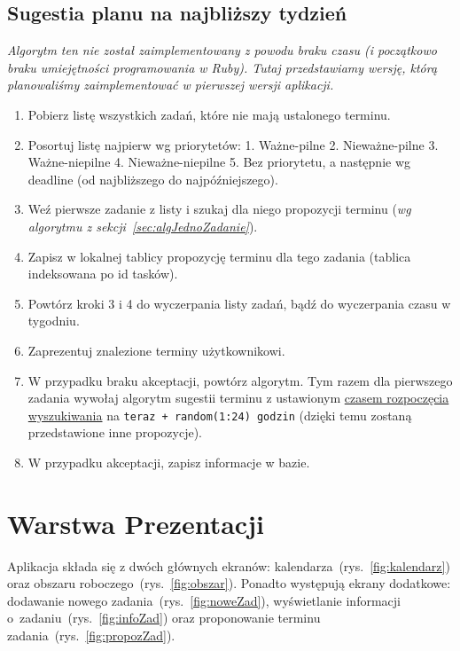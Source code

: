 \documentclass[pdflatex,11pt]{aghdpl}
\begin{document}
\subsection{Sugestia planu na najbliższy tydzień}
\label{sec:algPlanTygodniowy}

\textit{Algorytm ten nie został zaimplementowany z powodu braku czasu (i początkowo braku umiejętności programowania w Ruby). Tutaj przedstawiamy wersję, którą planowaliśmy zaimplementować w pierwszej wersji aplikacji.}

\begin{enumerate}
\item Pobierz listę wszystkich zadań, które nie mają ustalonego terminu.
\item Posortuj listę najpierw wg priorytetów: 1. Ważne-pilne 2. Nieważne-pilne 3. Ważne-niepilne 4. Nieważne-niepilne 5. Bez priorytetu, a następnie wg deadline (od najbliższego do najpóźniejszego).
\item Weź pierwsze zadanie z listy i szukaj dla niego propozycji terminu (\textit{wg algorytmu z sekcji~\ref{sec:algJednoZadanie}}).
\item Zapisz w lokalnej tablicy propozycję terminu dla tego zadania (tablica indeksowana po id tasków).
\item Powtórz kroki 3 i 4 do wyczerpania listy zadań, bądź do wyczerpania czasu w tygodniu.
\item Zaprezentuj znalezione terminy użytkownikowi.
\item W przypadku braku akceptacji, powtórz algorytm. Tym razem dla pierwszego zadania wywołaj algorytm sugestii terminu z ustawionym \underline{czasem rozpoczęcia wyszukiwania} na \texttt{teraz + random(1:24) godzin} (dzięki temu zostaną przedstawione inne propozycje).
\item W przypadku akceptacji, zapisz informacje w bazie.
\end{enumerate}


\section{Warstwa Prezentacji}

Aplikacja składa się z dwóch głównych ekranów: kalendarza~(rys.~\ref{fig:kalendarz}) oraz obszaru roboczego~(rys.~\ref{fig:obszar}). Ponadto występują ekrany dodatkowe: dodawanie nowego zadania~(rys.~\ref{fig:noweZad}), wyświetlanie informacji o~zadaniu~(rys.~\ref{fig:infoZad}) oraz proponowanie terminu zadania~(rys.~\ref{fig:propozZad}).
\end{document}
